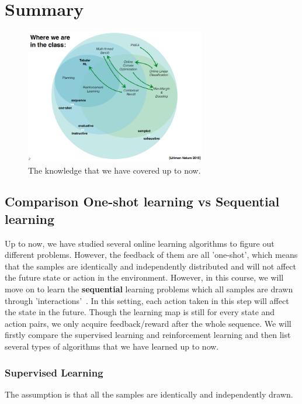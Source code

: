 \documentclass[11pt]{article}
\begin{document}
\section{Summary}
\begin{figure}[H]
\centering
    \includegraphics[width=0.7\textwidth]{1.png}
    \caption{The knowledge that we have covered up to now.}
	\label{fig:3.2-original}
\end{figure}

\subsection{Comparison One-shot learning vs Sequential learning}
Up to now, we have studied several online learning algorithms to figure out different problems. However, the feedback of them are all 'one-shot', which means that the samples are identically and independently distributed and will not affect the future state or action in the environment. However, in this course, we will move on to learn the \textbf{sequential} learning problems which all samples are drawn through 'interactions'~\cite{kaelbling1996reinforcement}. In this setting, each action taken in this step will affect the state in the future. Though the learning map is still for every state and action pairs, we only acquire feedback/reward after the whole sequence. We will firstly compare the supervised learning and reinforcement learning and then list several types of algorithms that we have learned up to now.



\subsubsection{Supervised Learning}

The assumption is that all the samples are identically and independently drawn.
\end{document}
